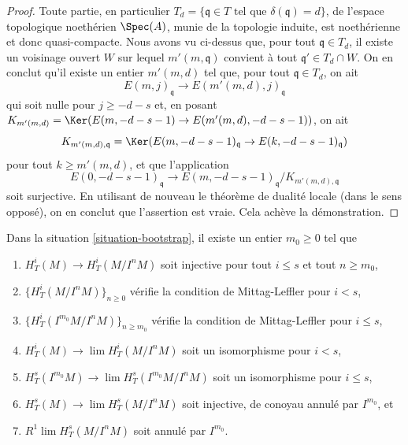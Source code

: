 \begin{proof}
\medskip\noindent
Toute partie, en particulier
$T_d = \{\mathfrak q \in T \text{ tel que }\delta(\mathfrak q) = d\}$,
de l'espace topologique noethérien $\Spec(A)$,
munie de la topologie induite, est noethérienne et donc quasi-compacte.
Nous avons vu ci-dessus que, pour tout $\mathfrak q \in T_d$,
il existe un voisinage ouvert $W$ sur lequel
$m'(m, \mathfrak q)$ convient à tout $\mathfrak q' \in T_d \cap W$.
On en conclut qu'il existe un entier $m'(m, d)$ tel que, pour tout
$\mathfrak q \in T_d$, on ait
$$
E(m, j)_\mathfrak q \to E(m'(m, d), j)_\mathfrak q
$$
qui soit nulle pour $j \geq -d - s$ et, en posant
$K_{m'(m, d)} = \Ker(E(m, -d - s - 1) \to E(m'(m, d), -d - s - 1))$,
on ait
$$
K_{m'(m, d), \mathfrak q} =
\Ker(E(m, -d - s - 1)_{\mathfrak q} \to E(k, -d - s - 1)_{\mathfrak q})
$$
pour tout $k \geq m'(m, d)$, et que l'application
$$
E(0, -d - s - 1)_\mathfrak q \to
E(m, -d - s - 1)_\mathfrak q/K_{m'(m, d), \mathfrak q}
$$
soit surjective. En utilisant de nouveau le théorème de dualité locale (dans le sens
opposé), on en conclut que l'assertion est vraie. Cela achève la démonstration.
\end{proof}

\begin{lemma}
\label{lemma-final-bootstrap}
Dans la situation \ref{situation-bootstrap}, il existe un entier $m_0 \geq 0$
tel que
\begin{enumerate}
\item $H^i_T(M) \to H^i_T(M/I^nM)$ soit injective pour tout $i \leq s$
et tout $n \geq m_0$,
\item $\{H^i_T(M/I^nM)\}_{n \geq 0}$
vérifie la condition de Mittag-Leffler pour $i < s$,
\item $\{H^i_T(I^{m_0}M/I^nM)\}_{n \geq m_0}$
vérifie la condition de Mittag-Leffler pour $i \leq s$,
\item $H^i_T(M) \to \lim H^i_T(M/I^nM)$
soit un isomorphisme pour $i < s$,
\item $H^s_T(I^{m_0}M) \to \lim H^s_T(I^{m_0}M/I^nM)$
soit un isomorphisme pour $i \leq s$,
\item $H^s_T(M) \to \lim H^s_T(M/I^nM)$ soit
injective, de conoyau annulé par $I^{m_0}$, et
\item $R^1\lim H^s_T(M/I^nM)$ soit annulé par $I^{m_0}$.
\end{enumerate}
\end{lemma}

